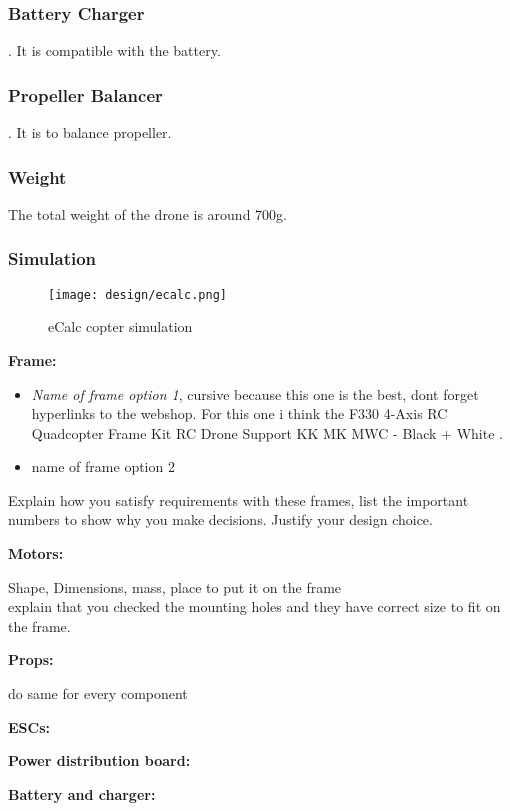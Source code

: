 \subsubsection{Battery Charger}
\cite{bangood_battery_charger}. It is compatible with the battery.

\subsubsection{Propeller Balancer}
\cite{bangood_prop_balancer}. It is to balance propeller.

\subsubsection{Weight}
The total weight of the drone is around 700g.

\subsubsection{Simulation}
\begin{figure}[!ht]
    \centering
    \texttt{[image: design/ecalc.png]}
    \caption{eCalc copter simulation}
    \label{fig:ecalc}
\end{figure}

\textbf{Frame:}
\begin{itemize}
    \item \textit{Name of frame option 1}, cursive because this one is the best, dont forget hyperlinks to the webshop. For this one i think the F330 4-Axis RC Quadcopter Frame Kit RC Drone Support KK MK MWC - Black + White \cite{bangood_f330}.
    \item name of frame option 2
\end{itemize}
Explain how you satisfy requirements with these frames, list the important numbers to show why you make decisions. Justify your design choice.

\textbf{Motors:}

Shape, Dimensions, mass, place to put it on the frame
\\explain that you checked the mounting holes and they have correct size to fit on the frame.

\textbf{Props:}

do same for every component

\textbf{ESCs:}

\textbf{Power distribution board:}

\textbf{Battery and charger:}

